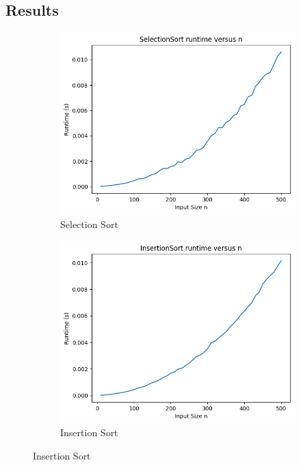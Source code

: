\documentclass{article}
\begin{document}
\subsection*{Results}
\begin{figure}[H]
	\centering
	\begin{subfigure}{.3\textwidth}
		\includegraphics[width=\textwidth]{../results/normal/SelectionSort.png}
		\caption{Selection Sort}
	\end{subfigure}
	\begin{subfigure}{.3\textwidth}
		\includegraphics[width=\textwidth]{../results/normal/InsertionSort.png}
		\caption{Insertion Sort}
	\end{subfigure}

\end{figure}
\end{document}
